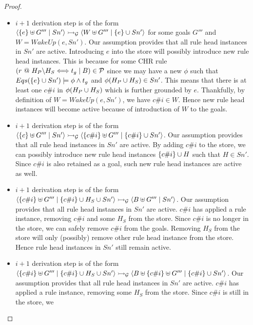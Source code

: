 \documentclass{tlp}
\begin{document}
\begin{proof}
  \begin{itemize}
	  \item {} $i+1$ derivation step is of the form 
	        $\langle \{e\} \uplus G'''\mid Sn' \rangle \rightarrowtail_{\cal G} \langle W \uplus G'''\mid\{e\} \cup Sn' \rangle$
	        for some goals $G'''$ and $W = WakeUp(e,Sn')$. Our assumption provides that all rule head instances
	        in $Sn'$ are active. Introducing $e$ into the store will possibly introduce new rule head instances. 
	        This is because for some CHR rule $(r~@~H_P \backslash H_S \Longleftrightarrow t_g\mid B) \in {\cal P}$ 
	        since we may have a new $\phi$ such that \ $Eqs(\{e\} \cup Sn') \models \phi \wedge t_g$ and 
	        $\phi(H_P \cup H_S) \in Sn'$. This means that there is at least one $c\#i$ in $\phi(H_P \cup H_S)$ 
	        which is further grounded by $e$. Thankfully, by definition of $W = WakeUp(e,Sn')$, we have $c\#i \in W$. 
	        Hence new rule head instances will become active because of introduction of $W$ to the goals.
	  \item {} $i+1$ derivation step is of the form
	        $\langle \{c\} \uplus G'''\mid Sn' \rangle \rightarrowtail_{\cal G} \langle \{c\#i\} \uplus G'''\mid\{c\#i\} \cup Sn' \rangle$. 
	        Our assumption provides that all rule head instances in $Sn'$ are active. By adding $c\#i$ to the
	        store, we can possibly introduce new rule head instances $\{c\#i\} \cup H$ such that $H \in Sn'$.
	        Since $c\#i$ is also retained as a goal, such new rule head instances are active as well. 
	  \item {} $i+1$ derivation step is of the form
	        $\langle \{c\#i\} \uplus G'''\mid\{c\#i\} \cup H_S \cup Sn' \rangle \rightarrowtail_{\cal G} \langle B \uplus G'''\mid Sn' \rangle$. 
	        Our assumption provides that all rule head instances in $Sn'$ are active. $c\#i$ has applied a rule
	        instance, removing $c\#i$ and some $H_S$ from the store. Since $c\#i$ is no longer in the store, we
	        can safely remove $c\#i$ from the goals. Removing $H_S$ from the store will only (possibly) remove
	        other rule head instance from the store. Hence rule head instances in $Sn'$ still remain active. 
	  \item {} $i+1$ derivation step is of the form
	        $\langle \{c\#i\} \uplus G'''\mid\{c\#i\} \cup H_S \cup Sn' \rangle \rightarrowtail_{\cal G} 
	        \langle B \uplus \{c\#i\} \uplus G'''\mid\{c\#i\} \cup Sn' \rangle$. 
	        Our assumption provides that all rule head instances in $Sn'$ are active. $c\#i$ has applied a rule
	        instance, removing some $H_S$ from the store. Since $c\#i$ is still in the store, we

\end{itemize}
\end{proof}
\end{document}
